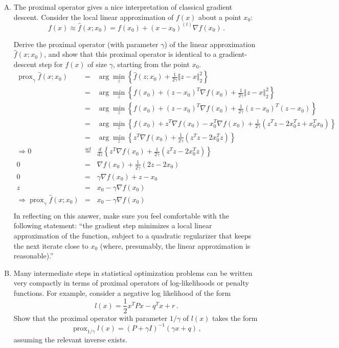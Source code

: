 \documentclass{article}
\newcommand{\prox}{ \mathop{\mathrm{prox}} }
\newcommand{\enorm}[1]{\Vert #1 \Vert_2}
\begin{document}
\begin{enumerate}[(A)]
\item
The proximal operator gives a nice interpretation of classical gradient descent.  Consider the local linear approximation of $f(x)$ about a point $x_0$:
$$
f(x) \approx \hat{f}(x; x_0) = f(x_0) + (x - x_0)^{(t)} \nabla f(x_0) \, .
$$

Derive the proximal operator (with parameter $\gamma$) of the linear approximation $\hat{f}(x; x_0)$, and show that this proximal operator is identical to a gradient-descent step for $f(x)$ of size $\gamma$, starting from the point $x_0$.  
\color{blue}
\begin{eqnarray*}
\prox_{\gamma} \hat{f}(x; x_0) &=& \arg \min_{z } \left\{  \hat{f}(z; x_0) + \frac{1}{2\gamma} \enorm{z - x}^2  \right\} \\
&=& \arg \min_{z } \left\{  f(x_0) + (z - x_0)^{T} \nabla f(x_0)  + \frac{1}{2\gamma} \enorm{z - x}^2  \right\} \\
&=& \arg \min_{z } \left\{ f(x_0) +  (z - x_0)^{T} \nabla f(x_0)  + \frac{1}{2\gamma}  (z - x_0)^{T}  (z - x_0) \right\} \\
&=& \arg \min_{z } \left\{ f(x_0) +  z ^T\nabla f(x_0)- x_0^{T} \nabla f(x_0)  + \frac{1}{2\gamma}  (z^Tz - 2x_0^{T}z  +x_0^T x_0) \right\} \\
&=& \arg \min_{z } \left\{ z ^T\nabla f(x_0)  + \frac{1}{2\gamma}  (z^Tz - 2x_0^{T}z ) \right\} \\
\Rightarrow 0 &\stackrel{set}{=}& \frac{d}{dz} \left\{ z ^T\nabla f(x_0)  + \frac{1}{2\gamma}  (z^Tz - 2x_0^{T}z ) \right\} \\
 0 &=& \nabla f(x_0)  + \frac{1}{2\gamma}  (2z - 2x_0 )  \\
 0 &=&\gamma \nabla  f(x_0)  +  z  -  x_0   \\
  z &=& x_0 - \gamma\nabla f(x_0)  \\
\Rightarrow\prox_{\gamma} \hat{f}(x; x_0) &=& x_0 - \gamma \nabla f(x_0)  \\
\end{eqnarray*}
\color{black}
In reflecting on this answer, make sure you feel comfortable with the following statement: ``the gradient step minimizes a local linear approximation of the function, subject to a quadratic regularizer that keeps the next iterate close to $x_0$ (where, presumably, the linear approximation is reasonable).''

\item Many intermediate steps in statistical optimization problems can be written very compactly in terms of proximal operators of log-likelihoods or penalty functions.  For example, consider a negative log likelihood of the form
$$
l(x) = \frac{1}{2} x^{T} P x - q^{T} x + r \, .
$$
Show that the proximal operator with parameter $1/\gamma$ of $l(x)$ takes the form
$$
\prox_{1/\gamma} l(x) = (P + \gamma I)^{-1} (\gamma  x + q) \, ,
$$
assuming the relevant inverse exists. 


\end{enumerate}
\end{document}
